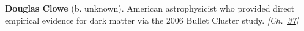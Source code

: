 \textbf{Douglas Clowe} (b. unknown). American astrophysicist who provided direct empirical evidence for dark matter via the 2006 Bullet Cluster study. \emph{[Ch.~\hyperref[ch:darkmatterevidence]{37}]}

